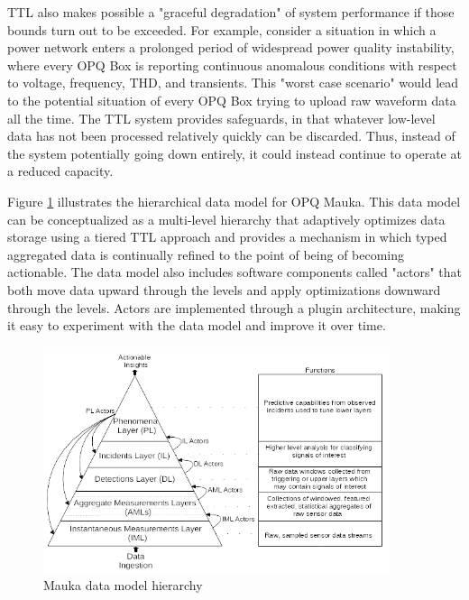  TTL also makes possible a "graceful degradation" of system performance if those bounds turn out to be exceeded. For example, consider a situation in which a power network enters a prolonged period of widespread power quality instability, where every OPQ Box is reporting continuous anomalous conditions with respect to voltage, frequency, THD, and transients.  This "worst case scenario" would lead to the potential situation of every OPQ Box trying to upload raw waveform data all the time. The TTL system provides safeguards, in that whatever low-level data has not been processed relatively quickly can be discarded.  Thus, instead of the system potentially going down entirely, it could instead continue to operate at a reduced capacity.

Figure \ref{fig:mauka-data-model} illustrates the hierarchical data model for OPQ Mauka. This data model can be conceptualized as a multi-level hierarchy that adaptively optimizes data storage using a tiered TTL approach and provides a mechanism in which typed aggregated data is continually refined to the point of being of becoming actionable. The data model also includes software components called "actors" that both move data upward through the levels and apply optimizations downward through the levels. Actors are implemented through a plugin architecture, making it easy to experiment with the data model and improve it over time.

\begin{figure}
\center \includegraphics[width=4in]{images/mauka/mauka-data-model.png}
\caption{Mauka data model hierarchy}
\label{fig:mauka-data-model}
\end{figure}


